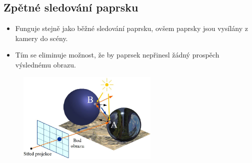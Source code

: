 \subsection{Zpětné sledování paprsku}
\begin{itemize}
 \item Funguje stejně jako běžné sledování paprsku, ovšem paprsky jsou vysílány z kamery do scény. 
 \item Tím se eliminuje možnost, že by paprsek nepřinesl žádný prospěch výslednému obrazu.
\end{itemize}
\begin{figure}[H]
\centering
\includegraphics[width=0.6\textwidth]{assets/6_ray_trace_kamera}
\end{figure}

